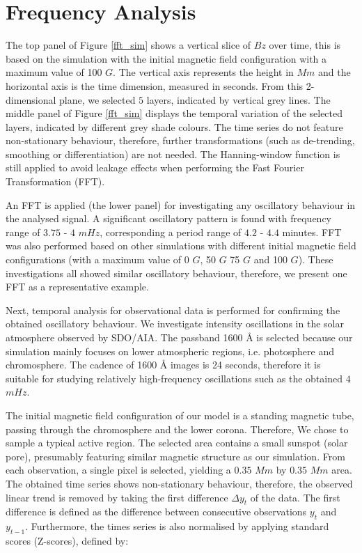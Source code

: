 \documentclass[linenumbers]{aastex63}
\begin{document}
\section{Frequency Analysis}

The top panel of Figure \ref{fft_sim} shows a vertical slice of $Bz$ over time, this is based on the simulation with the initial magnetic field configuration with a maximum value of 100 $G$. The vertical axis represents the height in $Mm$ and the horizontal axis is the time dimension, measured in seconds. From this 2-dimensional plane, we selected $5$ layers, indicated by vertical grey lines. The middle panel of Figure \ref{fft_sim} displays the temporal variation of the selected layers, indicated by different grey shade colours. The time series do not feature non-stationary behaviour, therefore, further transformations (such as de-trending, smoothing or differentiation) are not needed. The Hanning-window function is still applied to avoid leakage effects when performing the Fast Fourier Transformation (FFT).  

An FFT is applied (the lower panel) for investigating any oscillatory behaviour in the analysed signal. A significant oscillatory pattern is found with frequency range of $3.75$ - $4$ $mHz$, corresponding a period range of $4.2$ - $4.4$ minutes. FFT was also performed based on other simulations with different initial magnetic field configurations (with a maximum value of 0 $G$, 50 $G$ 75 $G$ and 100 $G$). These investigations all showed similar oscillatory behaviour, therefore, we present one FFT as a representative example. 

Next, temporal analysis for observational data is performed for confirming the obtained oscillatory behaviour. We investigate intensity oscillations in the solar atmosphere observed by SDO/AIA. The passband 1600 {\AA} is selected because our simulation mainly focuses on lower atmospheric regions, i.e. photosphere and chromosphere. The cadence of 1600 {\AA} images is 24 seconds, therefore it is suitable for studying relatively high-frequency oscillations such as the obtained $4$ $mHz$.

The initial magnetic field configuration of our model is a standing magnetic tube, passing through the chromosphere and the lower corona. Therefore, We chose to sample a typical active region. The selected area contains a small sunspot (solar pore), presumably featuring similar magnetic structure as our simulation. From each observation, a single pixel is selected, yielding a $0.35$ $Mm$ by $0.35$ $Mm$ area. The obtained time series shows non-stationary behaviour, therefore, the observed linear trend is removed by taking the first difference $\Delta  y_{t}$ of the data. The first difference is defined as the difference between consecutive observations $y_{t}$ and $y_{t-1}$. Furthermore, the times series is also normalised by applying standard scores (Z-scores), defined by:
\end{document}
